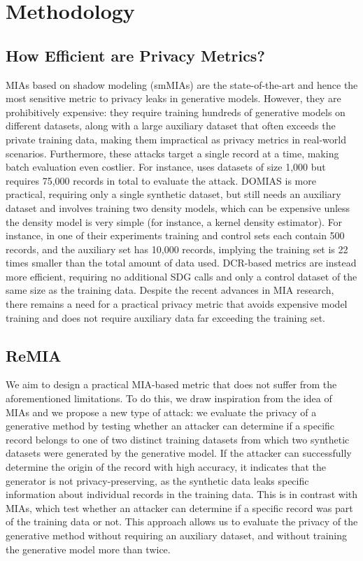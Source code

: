 \section{Methodology}
\subsection{How Efficient are Privacy Metrics?}
MIAs based on shadow modeling (smMIAs) \citep{stadler2022synthetic, houssiau2022tapas, meeus2023achilles} are the state-of-the-art and hence the most sensitive metric to privacy leaks in generative models. However, they are prohibitively expensive: they require training hundreds of generative models on different datasets, along with a large auxiliary dataset that often exceeds the private training data, making them impractical as privacy metrics in real-world scenarios. Furthermore, these attacks target a single record at a time, making batch evaluation even costlier. For instance, \citet{meeus2023achilles} uses datasets of size 1,000 but requires 75,000 records in total to evaluate the attack.
DOMIAS \citep{van2023membership} is more practical, requiring only a single synthetic dataset, but still needs an auxiliary dataset and involves training two density models, which can be expensive unless the density model is very simple (for instance, a kernel density estimator). For instance, in one of their experiments training and control sets each contain 500 records, and the auxiliary set has 10,000 records, implying the training set is 22 times smaller than the total amount of data used.
DCR-based metrics are instead more efficient, requiring no additional SDG calls and only a control dataset of the same size as the training data.
Despite the recent advances in MIA research, there remains a need for a practical privacy metric that avoids expensive model training and does not require auxiliary data far exceeding the training set.

\subsection{ReMIA}
We aim to design a practical MIA-based metric that does not suffer from the aforementioned limitations.
To do this, we draw inspiration from the idea of MIAs and we propose a new type of attack: we evaluate the privacy of a generative method by testing whether an attacker can determine if a specific record belongs to one of two distinct training datasets from which two synthetic datasets were generated by the generative model.
If the attacker can successfully determine the origin of the record with high accuracy, it indicates that the generator is not privacy-preserving, as the synthetic data leaks specific information about individual records in the training data.
This is in contrast with MIAs, which test whether an attacker can determine if a specific record was part of the training data or not.
This approach allows us to evaluate the privacy of the generative method without requiring an auxiliary dataset, and without training the generative model more than twice.

